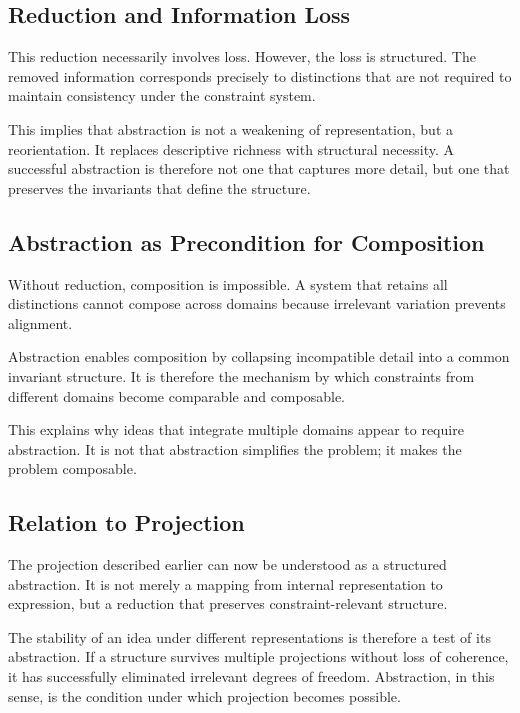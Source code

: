 \documentclass[11pt]{article}
\theoremstyle{plain}
\theoremstyle{definition}
\theoremstyle{remark}
\begin{document}
\subsection{Reduction and Information Loss}

This reduction necessarily involves loss. However, the loss is structured.
The removed information corresponds precisely to distinctions that are
not required to maintain consistency under the constraint system.

This implies that abstraction is not a weakening of representation, but
a reorientation. It replaces descriptive richness with structural
necessity. A successful abstraction is therefore not one that captures
more detail, but one that preserves the invariants that define the
structure.

\subsection{Abstraction as Precondition for Composition}

Without reduction, composition is impossible. A system that retains all
distinctions cannot compose across domains because irrelevant variation
prevents alignment.

Abstraction enables composition by collapsing incompatible detail into
a common invariant structure. It is therefore the mechanism by which
constraints from different domains become comparable and composable.

This explains why ideas that integrate multiple domains appear to require
abstraction. It is not that abstraction simplifies the problem; it makes
the problem composable.

\subsection{Relation to Projection}

The projection described earlier can now be understood as a structured
abstraction. It is not merely a mapping from internal representation to
expression, but a reduction that preserves constraint-relevant structure.

The stability of an idea under different representations is therefore a
test of its abstraction. If a structure survives multiple projections
without loss of coherence, it has successfully eliminated irrelevant
degrees of freedom. Abstraction, in this sense, is the condition under
which projection becomes possible.
\end{document}
